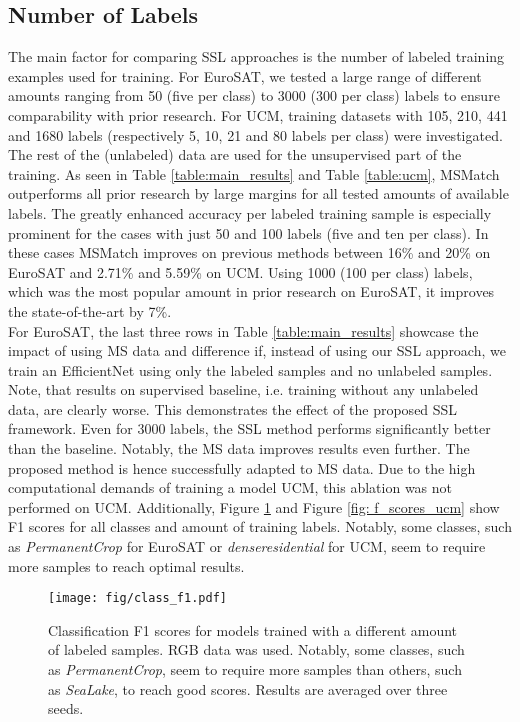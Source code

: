 \documentclass[journal]{IEEEtran}
\begin{document}
\subsection{Number of Labels}
The main factor for comparing SSL approaches is the number of labeled training examples used for training. For EuroSAT, we tested a large range of different amounts ranging from 50 (five per class) to 3000 (300 per class) labels to ensure comparability with prior research. For UCM, training datasets with 105, 210, 441 and 1680 labels (respectively 5, 10, 21 and 80 labels per class) were investigated. The rest of the (unlabeled) data are used for the unsupervised part of the training.
As seen in Table \ref{table:main_results} and Table \ref{table:ucm}, MSMatch outperforms all prior research by large margins for all tested amounts of available labels. The greatly enhanced accuracy per labeled training sample is especially prominent for the cases with just 50 and 100 labels (five and ten per class). In these cases MSMatch improves on previous methods between 16\% and 20\% on EuroSAT and 2.71\% and 5.59\% on UCM.
Using 1000 (100 per class) labels, which was the most popular amount in prior research on EuroSAT, it improves the state-of-the-art by 7\%.
\\
For EuroSAT, the last three rows in Table \ref{table:main_results} showcase the impact of using MS data and difference if, instead of using our SSL approach, we train an EfficientNet using only the labeled samples and no unlabeled samples. Note, that results on supervised baseline, i.e. training without any unlabeled data, are clearly worse. This demonstrates the effect of the proposed SSL framework. Even for 3000 labels, the SSL method performs significantly better than the baseline. Notably, the MS data improves results even further. The proposed method is hence successfully adapted to MS data.
Due to the high computational demands of training a model UCM, this ablation was not performed on UCM.
Additionally, Figure \ref{fig: f_scores_eurosat} and Figure \ref{fig: f_scores_ucm} show F1 scores for all classes and amount of training labels. Notably, some classes, such as \textit{PermanentCrop} for EuroSAT or \textit{denseresidential} for UCM, seem to require more samples to reach optimal results.

\begin{figure}[ht]
\centering
\texttt{[image: fig/class\_f1.pdf]}
\caption{Classification F1 scores for models trained with a different amount of labeled samples. RGB data was used. Notably, some classes, such as \textit{PermanentCrop}, seem to require more samples than others, such as \textit{SeaLake}, to reach good scores. Results are averaged over three seeds.}
\label{fig: f_scores_eurosat}
\end{figure}
\end{document}
